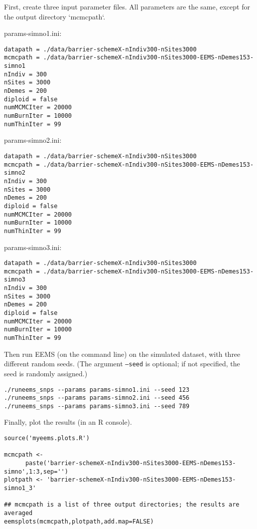 \documentclass[a4paper,10pt,DIV=15,mpinclude=true]{scrartcl}
\begin{document}
First, create three input parameter files. All parameters are the same, except for the output directory `mcmcpath`.

\bigskip

\noindent params-simno1.ini:
\begin{verbatim}
datapath = ./data/barrier-schemeX-nIndiv300-nSites3000
mcmcpath = ./data/barrier-schemeX-nIndiv300-nSites3000-EEMS-nDemes153-simno1
nIndiv = 300
nSites = 3000
nDemes = 200
diploid = false
numMCMCIter = 20000
numBurnIter = 10000
numThinIter = 99
\end{verbatim}

\noindent params-simno2.ini:
\begin{verbatim}
datapath = ./data/barrier-schemeX-nIndiv300-nSites3000
mcmcpath = ./data/barrier-schemeX-nIndiv300-nSites3000-EEMS-nDemes153-simno2
nIndiv = 300
nSites = 3000
nDemes = 200
diploid = false
numMCMCIter = 20000
numBurnIter = 10000
numThinIter = 99
\end{verbatim}

\noindent params-simno3.ini:
\begin{verbatim}
datapath = ./data/barrier-schemeX-nIndiv300-nSites3000
mcmcpath = ./data/barrier-schemeX-nIndiv300-nSites3000-EEMS-nDemes153-simno3
nIndiv = 300
nSites = 3000
nDemes = 200
diploid = false
numMCMCIter = 20000
numBurnIter = 10000
numThinIter = 99
\end{verbatim}

Then run EEMS (on the command line) on the simulated dataset, with three different random seeds. (The argument {\tt --seed} is optional; if not specified, the seed is randomly assigned.)

\begin{verbatim}
./runeems_snps --params params-simno1.ini --seed 123
./runeems_snps --params params-simno2.ini --seed 456
./runeems_snps --params params-simno3.ini --seed 789
\end{verbatim}

Finally, plot the results (in an R console).

\begin{verbatim}
source('myeems.plots.R')

mcmcpath <- 
      paste('barrier-schemeX-nIndiv300-nSites3000-EEMS-nDemes153-simno',1:3,sep='')
plotpath <- 'barrier-schemeX-nIndiv300-nSites3000-EEMS-nDemes153-simno1_3'

## mcmcpath is a list of three output directories; the results are averaged                                                                                
eemsplots(mcmcpath,plotpath,add.map=FALSE)
\end{verbatim}
\end{document}

